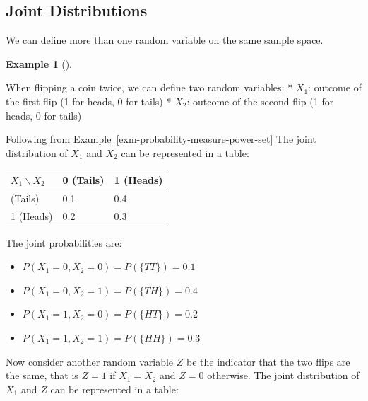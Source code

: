 \documentclass[
  letterpaper,
  DIV=11,
  numbers=noendperiod]{scrreport}
\providecommand{\tightlist}{%
  \setlength{\itemsep}{0pt}\setlength{\parskip}{0pt}}
\theoremstyle{definition}
\newtheorem{example}{Example}[chapter]
\theoremstyle{plain}
\theoremstyle{definition}
\theoremstyle{plain}
\theoremstyle{remark}
\begin{document}
\subsection{Joint Distributions}\label{joint-distributions}

We can define more than one random variable on the same sample space.

\begin{tcolorbox}[enhanced jigsaw, breakable, opacityback=0, leftrule=.75mm, colback=white, bottomtitle=1mm, coltitle=black, toptitle=1mm, titlerule=0mm, bottomrule=.15mm, colframe=quarto-callout-note-color-frame, title={Joint Distribution in the case of two coin flips}, opacitybacktitle=0.6, colbacktitle=quarto-callout-note-color!10!white, rightrule=.15mm, arc=.35mm, toprule=.15mm, left=2mm]

\begin{example}[]\protect\hypertarget{exm-joint-distribution-coin-flips}{}\label{exm-joint-distribution-coin-flips}

When flipping a coin twice, we can define two random variables: *
\(X_1\): outcome of the first flip (1 for heads, 0 for tails) * \(X_2\):
outcome of the second flip (1 for heads, 0 for tails)

Following from Example~\ref{exm-probability-measure-power-set} The joint
distribution of \(X_1\) and \(X_2\) can be represented in a table:

\begin{longtable}[]{@{}lll@{}}
\toprule\noalign{}
\(X_1 \backslash X_2\) & 0 (Tails) & 1 (Heads) \\
\midrule\noalign{}
\endhead
\bottomrule\noalign{}
\endlastfoot
0 (Tails) & 0.1 & 0.4 \\
1 (Heads) & 0.2 & 0.3 \\
\end{longtable}

The joint probabilities are:

\begin{itemize}
\tightlist
\item
  \(P(X_1=0, X_2=0) = P(\{TT\}) = 0.1\)
\item
  \(P(X_1=0, X_2=1) = P(\{TH\}) = 0.4\)
\item
  \(P(X_1=1, X_2=0) = P(\{HT\}) = 0.2\)
\item
  \(P(X_1=1, X_2=1) = P(\{HH\}) = 0.3\)
\end{itemize}

Now consider another random variable \(Z\) be the indicator that the two
flips are the same, that is \(Z=1\) if \(X_1=X_2\) and \(Z=0\)
otherwise. The joint distribution of \(X_1\) and \(Z\) can be
represented in a table:


\end{example}
\end{tcolorbox}
\end{document}
